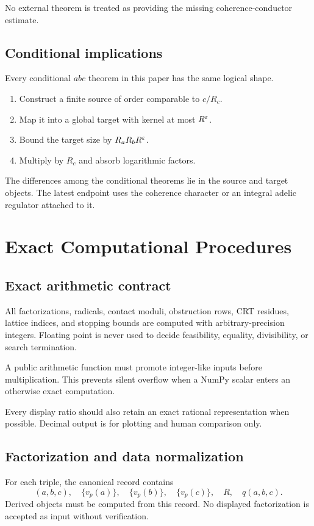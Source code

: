 No external theorem is treated as providing the missing coherence-conductor estimate.

\section{Conditional implications}
Every conditional $abc$ theorem in this paper has the same logical shape.

\begin{enumerate}[leftmargin=1.5em]
\item Construct a finite source of order comparable to $c/R_c$.
\item Map it into a global target with kernel at most $R^\varepsilon$.
\item Bound the target size by $R_aR_bR^\varepsilon$.
\item Multiply by $R_c$ and absorb logarithmic factors.
\end{enumerate}

The differences among the conditional theorems lie in the source and target objects. The latest endpoint uses the coherence character or an integral adelic regulator attached to it.

\chapter{Exact Computational Procedures}

\section{Exact arithmetic contract}
All factorizations, radicals, contact moduli, obstruction rows, CRT residues, lattice indices, and stopping bounds are computed with arbitrary-precision integers. Floating point is never used to decide feasibility, equality, divisibility, or search termination.

A public arithmetic function must promote integer-like inputs before multiplication. This prevents silent overflow when a NumPy scalar enters an otherwise exact computation.

Every display ratio should also retain an exact rational representation when possible. Decimal output is for plotting and human comparison only.

\section{Factorization and data normalization}
For each triple, the canonical record contains
\[
 (a,b,c),
 \quad
 \{v_p(a)\},
 \quad
 \{v_p(b)\},
 \quad
 \{v_p(c)\},
 \quad
 R,
 \quad
 q(a,b,c).
\]
Derived objects must be computed from this record. No displayed factorization is accepted as input without verification.

